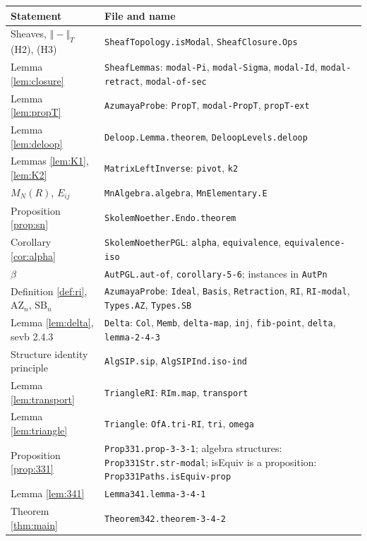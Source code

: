 \documentclass[11pt]{amsart}
\theoremstyle{definition}
\theoremstyle{remark}
\newcommand{\M}{M_N(R)}
\newcommand{\AZ}{\mathrm{AZ}_n}
\newcommand{\SB}{\mathrm{SB}_n}
\newcommand{\trT}[1]{\Vert #1\Vert_T}
\begin{document}
\medskip
{\small
\begin{longtable}{p{4.6cm}p{8.4cm}}
\textbf{Statement} & \textbf{File and name}\\ \hline
Sheaves, $\trT{-}$ (H2), (H3) & \texttt{SheafTopology.isModal},
  \texttt{SheafClosure.Ops}\\
Lemma \ref{lem:closure} & \texttt{SheafLemmas}: \texttt{modal-Pi},
  \texttt{modal-Sigma}, \texttt{modal-Id}, \texttt{modal-retract},
  \texttt{modal-of-sec}\\
Lemma \ref{lem:propT} & \texttt{AzumayaProbe}: \texttt{PropT},
  \texttt{modal-PropT}, \texttt{propT-ext}\\
Lemma \ref{lem:deloop} & \texttt{Deloop.Lemma.theorem},
  \texttt{DeloopLevels.deloop}\\
Lemmas \ref{lem:K1}, \ref{lem:K2} & \texttt{MatrixLeftInverse}:
  \texttt{pivot}, \texttt{k2}\\
$\M$, $E_{ij}$ & \texttt{MnAlgebra.algebra}, \texttt{MnElementary.E}\\
Proposition \ref{prop:sn} & \texttt{SkolemNoether.Endo.theorem}\\
Corollary \ref{cor:alpha} & \texttt{SkolemNoetherPGL}: \texttt{alpha},
  \texttt{equivalence}, \texttt{equivalence-iso}\\
$\beta$ & \texttt{AutPGL.aut-of}, \texttt{corollary-5-6}; instances in
  \texttt{AutPn}\\
Definition \ref{def:ri}, $\AZ$, $\SB$ & \texttt{AzumayaProbe}:
  \texttt{Ideal}, \texttt{Basis}, \texttt{Retraction}, \texttt{RI},
  \texttt{RI-modal}, \texttt{Types.AZ}, \texttt{Types.SB}\\
Lemma \ref{lem:delta}, sevb 2.4.3 & \texttt{Delta}: \texttt{Col},
  \texttt{Memb}, \texttt{delta-map}, \texttt{inj}, \texttt{fib-point},
  \texttt{delta}, \texttt{lemma-2-4-3}\\
Structure identity principle & \texttt{AlgSIP.sip}, \texttt{AlgSIPInd.iso-ind}\\
Lemma \ref{lem:transport} & \texttt{TriangleRI}: \texttt{RIm.map},
  \texttt{transport}\\
Lemma \ref{lem:triangle} & \texttt{Triangle}: \texttt{OfA.tri-RI},
  \texttt{tri}, \texttt{omega}\\
Proposition \ref{prop:331} & \texttt{Prop331.prop-3-3-1}; algebra
  structures: \texttt{Prop331Str.str-modal}; isEquiv is a proposition:
  \texttt{Prop331Paths.isEquiv-prop}\\
Lemma \ref{lem:341} & \texttt{Lemma341.lemma-3-4-1}\\
Theorem \ref{thm:main} & \texttt{Theorem342.theorem-3-4-2}\\

\end{longtable}}
\end{document}
